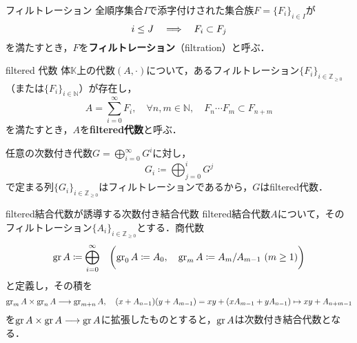 \documentclass[rep_main]{subfiles}
\begin{document}
\begin{mydef}[label=def:filtration]{フィルトレーション}
	全順序集合$I$で添字付けされた集合族$F = \{F_i\}_{i \in I}$が
	\begin{equation}
		i \leq J  \quad \Longrightarrow \quad  F_i \subset F_j
	\end{equation}
	を満たすとき，$F$を\textbf{フィルトレーション}（filtration）と呼ぶ．
\end{mydef}
\begin{mydef}[label=def:filtered-alg]{filtered 代数}
	体$\mathbb{K}$上の代数$(A, \cdot)$について，あるフィルトレーション$\{F_i\}_{i \in \mathbb{Z}_{\geq 0}}$（または$\{F_i\}_{i \in \mathbb{N}}$）が存在し，
	\begin{equation}
		A = \sum_{i = 0}^\infty F_i,\quad  \forall n, m \in \mathbb{N},\quad  F_n\cdots F_m \subset F_{n+m}
	\end{equation}
	を満たすとき，$A$を\textbf{filtered代数}と呼ぶ．
\end{mydef}
任意の次数付き代数$G = \bigoplus_{i=0}^\infty G^i$に対し，
\begin{equation}
	\label{eq:filtration-for-graded}
	G_i \coloneqq \bigoplus_{j = 0}^i G^j
\end{equation}
で定まる列$\{G_i\}_{i \in \mathbb{Z}_{\geq 0}}$はフィルトレーションであるから，$G$はfiltered代数．
\begin{myprop}[label=prop:graded-alg-by-filtered]{filtered結合代数が誘導する次数付き結合代数}
	filtered結合代数$A$について，そのフィルトレーション$\{A_i\}_{i \in \mathbb{Z}_{\geq 0}}$とする．商代数
	\begin{equation}
		\operatorname{gr} A \coloneqq \bigoplus_{i=0}^\infty\quad  \biggl(\operatorname{gr}_0A \coloneqq A_0,\quad  \operatorname{gr}_mA \coloneqq A_m / A_{m-1}\ (m \geq 1) \biggr)
	\end{equation}
	と定義し，その積を
	\begin{equation}
		\operatorname{gr}_m A \times \operatorname{gr}_n A \longrightarrow \operatorname{gr}_{m+n} A,\quad  (x + A_{n - 1})(y + A_{m - 1}) = xy + (xA_{m-1} + yA_{n-1}) \mapsto xy + A_{n + m -1}
	\end{equation}
	を$\operatorname{gr} A \times \operatorname{gr} A \longrightarrow \operatorname{gr} A$に拡張したものとすると，$\operatorname{gr} A$は次数付き結合代数となる．
\end{myprop}
\end{document}
